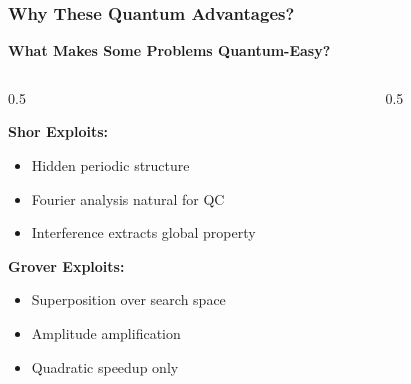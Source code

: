 \documentclass[aspectratio=169,10pt]{beamer}
\newcommand{\slideheader}[1]{\frametitle{#1}}
\theoremstyle{plain}
\begin{document}
\begin{frame}
  \slideheader{Why These Quantum Advantages?}
  
  \begin{center}
    \textbf{\large What Makes Some Problems Quantum-Easy?}
  \end{center}
  
  \vspace{0.5cm}
  
  \begin{columns}[T]
    \begin{column}{0.5\textwidth}

    \begin{blueBox}
      \textbf{Shor Exploits:}
      \begin{itemize}
        \item Hidden periodic structure
        \item Fourier analysis natural for QC
        \item Interference extracts global property
      \end{itemize}
    \end{blueBox}
    
    \vspace{0.3cm}
    
    \begin{blueBox}
      \textbf{Grover Exploits:}
      \begin{itemize}
        \item Superposition over search space
        \item Amplitude amplification
        \item Quadratic speedup only
      \end{itemize}
    \end{blueBox}
  
    \end{column}
    \begin{column}{0.5\textwidth}

  

\end{column}
\end{columns}
\end{frame}
\end{document}
